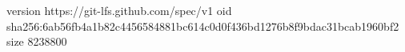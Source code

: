version https://git-lfs.github.com/spec/v1
oid sha256:6ab56fb4a1b82c4456584881bc614c0d0f436bd1276b8f9bdac31bcab1960bf2
size 8238800
